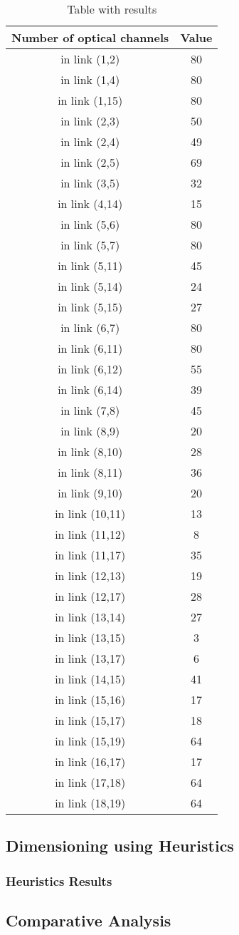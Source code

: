\begin{table}[h!]
\centering
\begin{tabular}{|| c | c||}
 \hline
 Number of optical channels & Value \\
 \hline\hline
 in link (1,2) & 80 \\
in link (1,4) & 80 \\
in link (1,15) & 80 \\
in link (2,3) & 50 \\
in link (2,4) & 49 \\
in link (2,5) & 69 \\
in link (3,5) & 32 \\
in link (4,14) & 15 \\
in link (5,6) & 80 \\
in link (5,7) & 80 \\
in link (5,11) & 45 \\
in link (5,14) & 24 \\
in link (5,15) & 27 \\
in link (6,7) & 80 \\
in link (6,11) & 80 \\
in link (6,12) & 55 \\
in link (6,14) & 39 \\
in link (7,8) & 45 \\
in link (8,9) & 20 \\
in link (8,10) & 28 \\
in link (8,11) & 36 \\
in link (9,10) & 20 \\
in link (10,11) & 13 \\
in link (11,12) & 8 \\
in link (11,17) & 35 \\
in link (12,13) & 19 \\
in link (12,17) & 28 \\
in link (13,14) & 27 \\
in link (13,15) & 3 \\
in link (13,17) & 6 \\
in link (14,15) & 41 \\
in link (15,16) & 17 \\
in link (15,17) & 18 \\
in link (15,19) & 64 \\
in link (16,17) & 17 \\
in link (17,18) & 64 \\
in link (18,19) & 64 \\
\hline
\end{tabular}
\caption{Table with results}
\label{result_ILP4}
\end{table}


\subsection{Dimensioning using Heuristics}

\subsubsection{Heuristics Results}

\subsection{Comparative Analysis} 